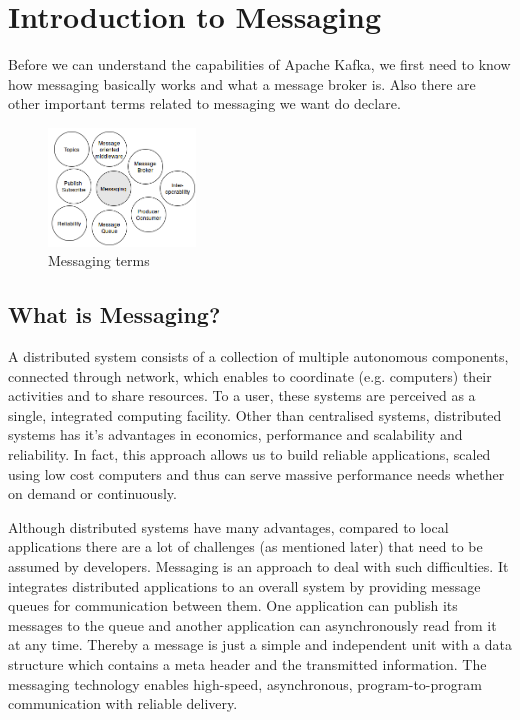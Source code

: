 \chapter{Introduction to Messaging} 

Before we can understand the capabilities of Apache Kafka, we first need to
know how messaging basically works and what a message broker is. Also there are other
important terms related to messaging we want do declare. 

\begin{figure}[H]
    \centering
    \includegraphics[width=0.35\textwidth]{images/messaging-intro.png}
    \caption{Messaging terms}
    \label{fig:MBig:the-log}
\end{figure}

\section{What is Messaging?}
A distributed system consists of a collection of multiple autonomous components,
connected through network, which enables to coordinate  (e.g. computers) their
activities and to share resources. To a user, these systems are perceived as a
single, integrated computing facility. Other than centralised systems,
distributed systems has it's advantages in economics, performance and
scalability and reliability. In fact, this approach allows us to build reliable
applications, scaled using low cost computers and thus can serve massive
performance needs whether on demand or continuously.\cite{POSA1}\cite{TAN06}

Although distributed systems have many advantages, compared to local
applications there are a lot of challenges (as mentioned later) that need to be
assumed by developers. Messaging is an approach to deal with such difficulties.
It integrates distributed applications to an overall system by providing message
queues for communication between them. One application can publish its messages
to the queue and another application can asynchronously read from it at any time.
Thereby a message is just a simple and independent unit with a data structure
which contains a meta header and the transmitted information. The messaging
technology enables high-speed, asynchronous, program-to-program communication
with reliable delivery.

